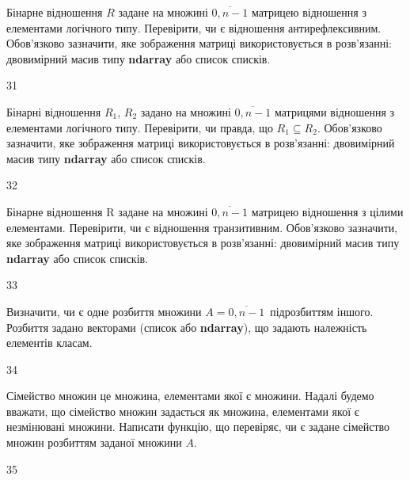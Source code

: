 Бінарне відношення $R$ задане на множині $\overline{0,n-1}$ матрицею відношення з елементами логічного типу. Перевірити, чи є відношення антирефлексивним. Обов'язково зазначити, яке зображення матриці використовується в розв'язанні: двовимірний масив типу \textbf{ndarray} або список списків.
\\\par
31 














Бінарні відношення $R_1$, $R_2$ задано на множині $\overline{0,n-1}$ матрицями відношення з елементами логічного типу. Перевірити, чи правда, що  $R_1\subseteq R_2$. Обов'язково зазначити, яке зображення матриці використовується в розв'язанні: двовимірний масив типу \textbf{ndarray} або список списків.
\\\par
32 














Бінарне відношення R задане на множині $\overline{0,n-1}$ матрицею відношення з цілими елементами.  Перевірити, чи є відношення транзитивним. Обов'язково зазначити, яке зображення матриці використовується в розв'язанні: двовимірний масив типу \textbf{ndarray} або список списків.
\\\par
33 














Визначити, чи є одне розбиття множини $A=\overline{0,n-1}$\ підрозбиттям іншого. Розбиття задано векторами (список або  \textbf{ndarray}), що задають належність елементів класам.
\\\par
34 














Сімейство множин це множина, елементами якої є множини. Надалі будемо вважати, що сімейство множин задається як множина, елементами якої є незмінювані множини. Написати функцію, що перевіряє, чи є задане сімейство множин розбиттям заданої множини $A$.
\\\par
35 














